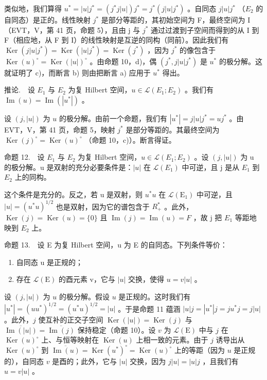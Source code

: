 类似地，我们算得 \(u^{*} = |u|j^{*} = (j^{*}j|u|)j^{*} = j^{*}(j|u|j^{*})\) 。自同态 \(j|u|j^{*}\) （\(E_{2}\) 的自同态）是正的。线性映射 \(j^{*}\) 是部分等距的，其初始空间为 F，最终空间为 I（EVT，V，第 41 页，命题 5），且由 j 与 \(j^{*}\) 通过过渡到子空间而得到的从 I 到 F（相应地，从 F 到 I）的线性映射是互逆的同构（同前）。因此我们有 \(\operatorname{Ker}(j|u|j^{*}) = \operatorname{Ker}(|u|j^{*}) = \operatorname{Ker}(j^{*})\) ，因为 \(j^{*}\) 的像包含于 \(\operatorname{Ker}(u)^{\circ} = \operatorname{Ker}(|u|)^{\circ}\) 。由命题 10，d)，偶 \((j^{*}, j|u|j^{*})\) 是 \(u^{*}\) 的极分解。这就证明了 c)，而断言 b) 则由把断言 a) 应用于 \(u^{*}\) 得出。

推论.　设 \(E_{1}\) 与 \(E_{2}\) 为复 Hilbert 空间，\(u \in \mathcal{L}(E_{1}; E_{2})\) 。我们有 \(\operatorname{Im}(u) = \operatorname{Im}(|u^{*}|)\) 。

设 \((j, |u|)\) 为 \(u\) 的极分解。由前一个命题，我们有 \(|u^{*}| = j|u|j^{*} = uj^{*}\) 。由 EVT，V，第 41 页，命题 5，映射 \(j^{*}\) 是部分等距的。其最终空间为 \(\operatorname{Ker}(j)^{\circ} = \operatorname{Ker}(u)^{\circ}\) （命题 10，c)）。断言得证。

命题 12.　设 \(E_{1}\) 与 \(E_{2}\) 为复 Hilbert 空间，\(u \in \mathcal{L}(E_{1}; E_{2})\) 。设 \((j, |u|)\) 为 u 的极分解。u 是双射的充分必要条件是：\(|u|\) 在 \(\mathcal{L}(E_{1})\) 中可逆，且 j 是从 \(E_{1}\) 到 \(E_{2}\) 上的同构。

这个条件是充分的。反之，若 u 是双射，则 \(u^{*}u\) 在 \(\mathcal{L}(\mathrm{E}_{1})\) 中可逆，且 \(|u| = (u^{*}u)^{1/2}\) 也是双射，因为它的谱包含于 \(R_{+}^{*}\) 。此外，\(\operatorname{Ker}(j) = \operatorname{Ker}(u) = \{0\}\) 且 \(\operatorname{Im}(j) = \operatorname{Im}(u) = F\) ，故 j 把 \(E_{1}\) 等距地映到 \(E_{2}\) 上。

命题 13.　设 E 为复 Hilbert 空间，u 为 E 的自同态。下列条件等价：

\begin{enumerate}
\def\labelenumi{(\roman{enumi})}
\item
  自同态 u 是正规的；
\item
  存在 \(\mathcal{L}(\mathrm{E})\) 的酉元素 v，它与 \(|u|\) 交换，使得 \(u = v|u|\) 。
\end{enumerate}

设 \((j,|u|)\) 为 \(u\) 的极分解。假设 \(u\) 是正规的。这时我们有 \(|u^{*}| = (uu^{*})^{1/2} = (u^{*}u)^{1/2} = |u|\) 。于是命题 11 蕴涵 \(|u|j = |u^{*}|j = ju^{*}j = j|u|\) 。此外，\(j\) 使互补的正交子空间 \(\operatorname{Ker}(|u|) = \operatorname{Ker}(j)\) 与 \(\overline{\operatorname{Im}(|u|)} = \overline{\operatorname{Im}(j)}\) 保持稳定（命题 10）。设 \(v\) 为 \(\mathcal{L}(\mathrm{E})\) 中与 \(j\) 在 \(\operatorname{Ker}(u)^{\circ}\) 上、与恒等映射在 \(\operatorname{Ker}(u)\) 上相一致的元素。由于 \(j\) 诱导出从 \(\operatorname{Ker}(u)^{\circ}\) 到 \(\overline{\operatorname{Im}(u)} = \operatorname{Ker}(u^{*})^{\circ} = \operatorname{Ker}(u)^{\circ}\) 上的等距（因为 \(u\) 是正规的），自同态 \(v\) 是酉的；此外，它与 \(|u|\) 交换，因为 \(j|u| = |u|j\) ，且我们有 \(u = v|u|\) 。

